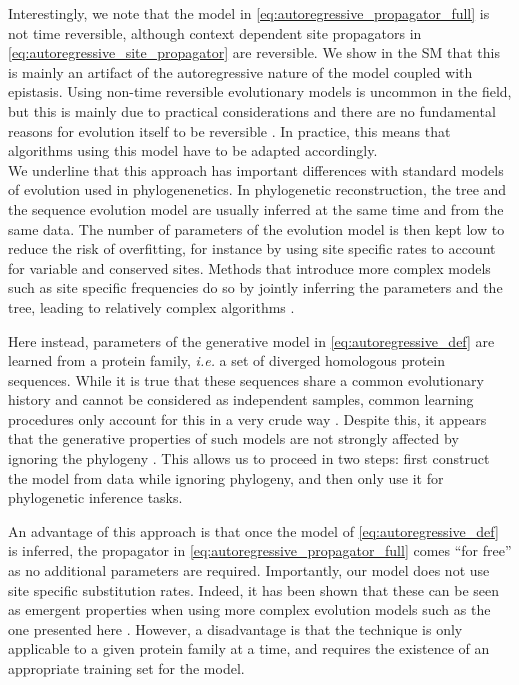 Interestingly, we note that the model in \eqref{eq:autoregressive_propagator_full} is not time reversible, although context dependent site propagators in \eqref{eq:autoregressive_site_propagator} are reversible. 
We show in the SM that this is mainly an artifact of the autoregressive nature of the model coupled with epistasis. 
Using non-time reversible evolutionary models is uncommon in the field, but this is mainly due to practical considerations and there are no fundamental reasons for evolution itself to be reversible \cite{felsensteinjoseph_inferringphylogenies_2003}. 
In practice, this means that algorithms using this model have to be adapted accordingly. \\


We underline that this approach has important differences with standard models of evolution used in phylogenenetics. 
In phylogenetic reconstruction, the tree and the sequence evolution model are usually inferred at the same time and from the same data. 
The number of parameters of the evolution model is then kept low to reduce the risk of overfitting, for instance by using site specific rates to account for variable and conserved sites. 
Methods that introduce more complex models such as site specific frequencies do so by jointly inferring the parameters and the tree, leading to relatively complex algorithms \cite{halpern_evolutionarydistancesproteincoding_1998a,puller_efficientinferencepotential_2020}.

Here instead, parameters of the generative model in \eqref{eq:autoregressive_def} are learned from a protein family, \emph{i.e.} a set of diverged homologous protein sequences. 
While it is true that these sequences share a common evolutionary history and cannot be considered as independent samples, common learning procedures only account for this in a very crude way \cite{cocco_inversestatisticalphysics_2018,trinquier_efficientgenerativemodeling_2021}.
Despite this, it appears that the generative properties of such models are not strongly affected by ignoring the phylogeny \cite{hockenberry_phylogeneticweightingdoes_2019,rodriguezhorta_effectphylogeneticcorrelations_2021}. 
This allows us to proceed in two steps: first construct the model from data while ignoring phylogeny, and then only use it for phylogenetic inference tasks.

An advantage of this approach is that once the model of \eqref{eq:autoregressive_def} is inferred, the propagator in \eqref{eq:autoregressive_propagator_full} comes ``for free'' as no additional parameters are required. 
Importantly, our model does not use site specific substitution rates. 
Indeed, it has been shown that these can be seen as emergent properties when using more complex evolution models such as the one presented here \cite{delapaz_epistaticcontributionspromote_2020}.
However, a disadvantage is that the technique is only applicable to a given protein family at a time, and requires the existence of an appropriate training set for the model. 


